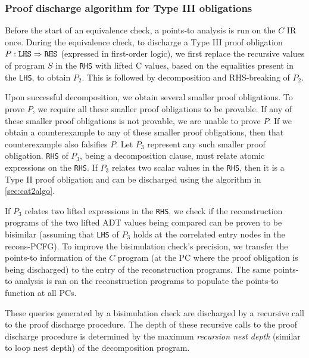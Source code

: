\vspace{-5px}
\subsubsection{Proof discharge algorithm for Type III obligations}
\label{sec:cat3summary}

Before the start of an equivalence check, a points-to analysis is run on the $C$ IR once.
During the equivalence check,
to discharge a Type III proof obligation $P: {\tt LHS}\Rightarrow{\tt RHS}$ (expressed
in first-order logic), we first replace the recursive
values of program $S$ in the {\tt RHS}
with lifted C values, based on the equalities present in the {\tt LHS}, to
obtain $P_2$.
This is followed by decomposition and RHS-breaking of $P_2$.

Upon successful decomposition, we
obtain several smaller proof obligations.
To prove $P$, we require all these smaller proof
obligations to be provable. If any of these smaller proof obligations
is not provable, we are unable to prove $P$.  If we obtain a counterexample
to any of these smaller proof obligations, then that counterexample
also falsifies $P$.
Let $P_3$ represent any such smaller proof obligation.
{\tt RHS} of $P_3$, being
a decomposition clause,
must relate atomic expressions on the {\tt RHS}.
If $P_3$ relates two scalar values in the {\tt RHS}, then
it is a Type II proof obligation and can be discharged
using the algorithm in \cref{sec:cat2algo}.

If $P_3$ relates two lifted
expressions in
the {\tt RHS},
we check if the reconstruction
programs of the two lifted ADT values being
compared can be proven to be bisimilar (assuming that
{\tt LHS} of $P_3$ holds at the correlated entry nodes
in the recons-PCFG).
To improve
the bisimulation
check's precision, we transfer the points-to information of the $C$ program
(at the PC where the proof obligation is being discharged) to the entry
of the reconstruction programs. The same points-to analysis is ran on the
reconstruction programs to populate the points-to function at all PCs.

These queries
generated by a bisimulation check are discharged
by a recursive call to the proof discharge procedure.
The depth of these recursive calls to the
proof discharge procedure is determined by
the maximum {\em recursion nest depth} (similar
to loop nest depth) of the decomposition
program.


